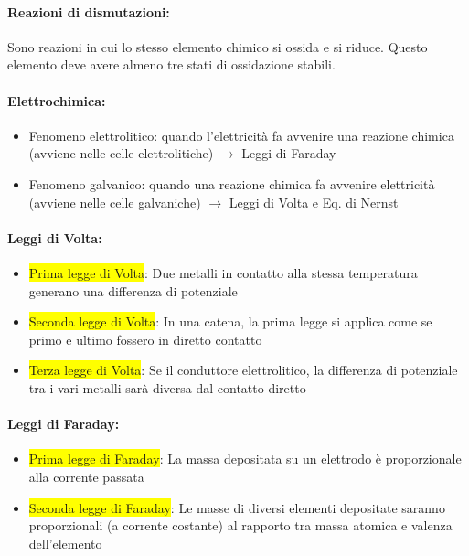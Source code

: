 \documentclass{article}
\begin{document}
\paragraph{Reazioni di dismutazioni:} Sono reazioni in cui lo stesso elemento chimico si ossida e si riduce. Questo elemento deve avere almeno tre stati di ossidazione stabili.
\paragraph{Elettrochimica:} \begin{itemize}
	\item Fenomeno elettrolitico: quando l'elettricità fa avvenire una reazione chimica (avviene nelle celle elettrolitiche) $\rightarrow$ Leggi di Faraday
	\item Fenomeno galvanico: quando una reazione chimica fa avvenire elettricità (avviene nelle celle galvaniche) $\rightarrow$ Leggi di Volta e Eq. di Nernst
\end{itemize}

\paragraph{Leggi di Volta: } \begin{itemize}
	\item \colorbox{yellow}{Prima legge di Volta}: Due metalli in contatto alla stessa temperatura generano una differenza di potenziale
	\item \colorbox{yellow}{Seconda legge di Volta}: In una catena, la prima legge si applica come se primo e ultimo fossero in diretto contatto
	\item \colorbox{yellow}{Terza legge di Volta}: Se il conduttore elettrolitico, la differenza di potenziale tra i vari metalli sarà diversa dal contatto diretto
\end{itemize}
\paragraph{Leggi di Faraday: } \begin{itemize}
	\item \colorbox{yellow}{Prima legge di Faraday}: La massa depositata su un elettrodo è proporzionale alla corrente passata
	\item \colorbox{yellow}{Seconda legge di Faraday}: Le masse di diversi elementi depositate saranno proporzionali (a corrente costante) al rapporto tra massa atomica e valenza dell'elemento
\end{itemize}
\end{document}
